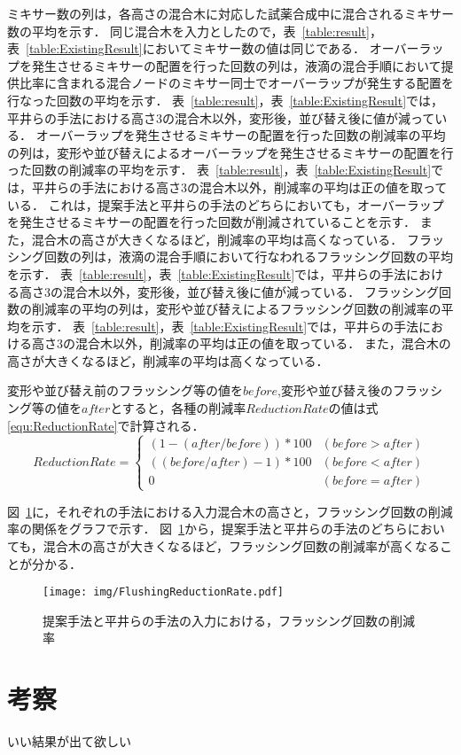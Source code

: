 ミキサー数の列は，各高さの混合木に対応した試薬合成中に混合されるミキサー数の平均を示す．
同じ混合木を入力としたので，表~\ref{table:result}，表~\ref{table:ExistingResult}においてミキサー数の値は同じである．
オーバーラップを発生させるミキサーの配置を行った回数の列は，液滴の混合手順において提供比率に含まれる混合ノードのミキサー同士でオーバーラップが発生する配置を行なった回数の平均を示す．
表~\ref{table:result}，表~\ref{table:ExistingResult}では，平井らの手法における高さ3の混合木以外，変形後，並び替え後に値が減っている．
オーバーラップを発生させるミキサーの配置を行った回数の削減率の平均の列は，変形や並び替えによるオーバーラップを発生させるミキサーの配置を行った回数の削減率の平均を示す．
表~\ref{table:result}，表~\ref{table:ExistingResult}では，平井らの手法における高さ3の混合木以外，削減率の平均は正の値を取っている．
これは，提案手法と平井らの手法のどちらにおいても，オーバーラップを発生させるミキサーの配置を行った回数が削減されていることを示す．
また，混合木の高さが大きくなるほど，削減率の平均は高くなっている．
フラッシング回数の列は，液滴の混合手順において行なわれるフラッシング回数の平均を示す．
表~\ref{table:result}，表~\ref{table:ExistingResult}では，平井らの手法における高さ3の混合木以外，変形後，並び替え後に値が減っている．
フラッシング回数の削減率の平均の列は，変形や並び替えによるフラッシング回数の削減率の平均を示す．
表~\ref{table:result}，表~\ref{table:ExistingResult}では，平井らの手法における高さ3の混合木以外，削減率の平均は正の値を取っている．
また，混合木の高さが大きくなるほど，削減率の平均は高くなっている．

変形や並び替え前のフラッシング等の値を$before$,変形や並び替え後のフラッシング等の値を$after$とすると，各種の削減率$ReductionRate$の値は式\ref{equ:ReductionRate}で計算される．
\begin{equation}
    ReductionRate = 
        \begin{cases}
            (1-(after/before))*100 & (before > after)\\
            ((before/after)-1)*100 & (before < after)\\
            0 & (before = after)
        \end{cases}
    \label{equ:ReductionRate}
\end{equation}

図~\ref{fig:FlushingReductionRate}に，それぞれの手法における入力混合木の高さと，フラッシング回数の削減率の関係をグラフで示す．
図~\ref{fig:FlushingReductionRate}から，提案手法と平井らの手法のどちらにおいても，混合木の高さが大きくなるほど，フラッシング回数の削減率が高くなることが分かる．

\begin{figure}[tbp]
 \centering\texttt{[image: img/FlushingReductionRate.pdf]}

 \caption{提案手法と平井らの手法の入力における，フラッシング回数の削減率}\label{fig:FlushingReductionRate}
\end{figure}

\section{考察}
いい結果が出て欲しい

